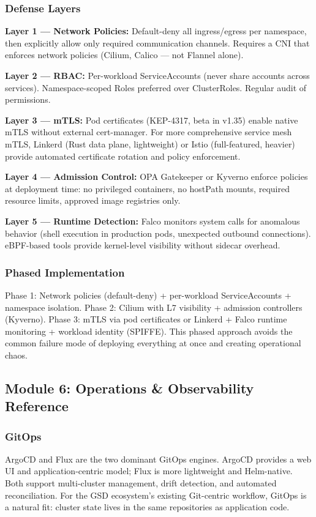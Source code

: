 \documentclass[11pt,letterpaper]{article}
\begin{document}
\subsubsection{Defense Layers}

\textbf{Layer 1 --- Network Policies:} Default-deny all ingress/egress per namespace, then explicitly allow only required communication channels. Requires a CNI that enforces network policies (Cilium, Calico --- not Flannel alone).

\textbf{Layer 2 --- RBAC:} Per-workload ServiceAccounts (never share accounts across services). Namespace-scoped Roles preferred over ClusterRoles. Regular audit of permissions.

\textbf{Layer 3 --- mTLS:} Pod certificates (KEP-4317, beta in v1.35) enable native mTLS without external cert-manager. For more comprehensive service mesh mTLS, Linkerd (Rust data plane, lightweight) or Istio (full-featured, heavier) provide automated certificate rotation and policy enforcement.

\textbf{Layer 4 --- Admission Control:} OPA Gatekeeper or Kyverno enforce policies at deployment time: no privileged containers, no hostPath mounts, required resource limits, approved image registries only.

\textbf{Layer 5 --- Runtime Detection:} Falco monitors system calls for anomalous behavior (shell execution in production pods, unexpected outbound connections). eBPF-based tools provide kernel-level visibility without sidecar overhead.

\subsubsection{Phased Implementation}
Phase 1: Network policies (default-deny) + per-workload ServiceAccounts + namespace isolation. Phase 2: Cilium with L7 visibility + admission controllers (Kyverno). Phase 3: mTLS via pod certificates or Linkerd + Falco runtime monitoring + workload identity (SPIFFE). This phased approach avoids the common failure mode of deploying everything at once and creating operational chaos.

\subsection{Module 6: Operations \& Observability Reference}

\subsubsection{GitOps}
ArgoCD and Flux are the two dominant GitOps engines. ArgoCD provides a web UI and application-centric model; Flux is more lightweight and Helm-native. Both support multi-cluster management, drift detection, and automated reconciliation. For the GSD ecosystem's existing Git-centric workflow, GitOps is a natural fit: cluster state lives in the same repositories as application code.
\end{document}
